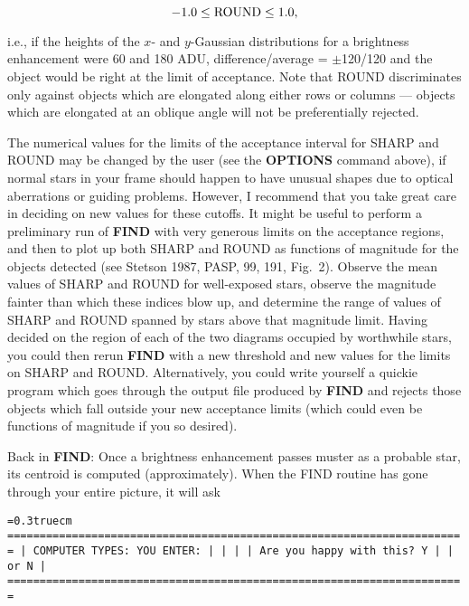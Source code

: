 $$-1.0 \leq \hbox{\rm ROUND} \leq 1.0,$$

\noindent i.e., if the heights of the $x$- and $y$-Gaussian
distributions for a brightness enhancement were 60 and 180 ADU,
difference/average = $\pm$120/120 and the object would be right at the
limit of acceptance.  Note that ROUND discriminates only against
objects which are elongated along either rows or columns --- objects
which are elongated at an oblique angle will not be preferentially
rejected.

The numerical values for the limits of the acceptance interval for
SHARP and ROUND may be changed by the user (see the {\bf OPTIONS}
command above),  if normal stars in your frame should happen to have
unusual shapes due to optical aberrations or guiding problems.
However, I recommend that you take great care in deciding on new values
for these cutoffs.  It might be useful to perform a preliminary run of
{\bf FIND} with very generous limits on the acceptance regions, and
then to plot up both SHARP and ROUND as functions of magnitude for the
objects detected (see Stetson 1987, PASP, 99, 191, Fig.~2).  Observe
the mean values of SHARP and ROUND for well-exposed stars, observe the
magnitude fainter than which these indices blow up, and determine the
range of values of SHARP and ROUND spanned by stars above that
magnitude limit.  Having decided on the region of each of the two
diagrams occupied by worthwhile stars, you could then rerun {\bf FIND}
with a new threshold and new values for the limits on SHARP and ROUND.
Alternatively, you could write yourself a quickie program which goes
through the output file produced by {\bf FIND} and rejects those
objects which fall outside your new acceptance limits (which could even
be functions of magnitude if you so desired).

Back in {\bf FIND}:  Once a brightness enhancement passes muster
as a probable star, its centroid is computed (approximately).  When the
FIND routine has gone through your entire picture, it will ask 

\bigskip
{\noindent\obeylines\obeyspaces\frenchspacing\tt\baselineskip=0.3truecm
=======================================================================
| COMPUTER TYPES:                                      YOU ENTER:     |
|                                                                     |
| Are you happy with this?                             Y              |
|                                                   or N              |
=======================================================================
}
\bigskip

